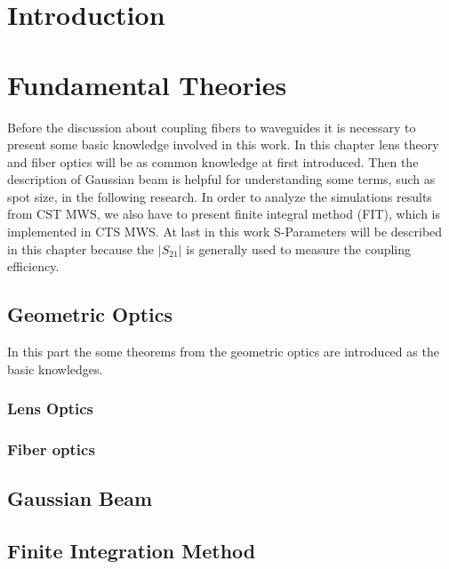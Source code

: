 
\chapter{Introduction}



\chapter{Fundamental Theories}
\label{chp:background}
Before the discussion about coupling fibers to waveguides it is necessary to present some basic knowledge involved in this work.  In this chapter lens theory and fiber optics will be as common knowledge at first introduced. Then the description of Gaussian beam is helpful for understanding some terms, such as spot size, in the following research.  
In order to analyze the simulations results from CST MWS, we also have to present finite integral method (FIT), which is implemented in CTS MWS. At last in this work S-Parameters will be described in this chapter because the $|S_{21}|$ is generally used to measure the coupling efficiency. 

\section{Geometric Optics}
\label{sect:background_optics}
In this part the  some theorems from the geometric optics  are introduced as the basic knowledges.
\subsection{Lens Optics}

\subsection{Fiber optics}


\section{Gaussian Beam}


\section{Finite Integration Method}



